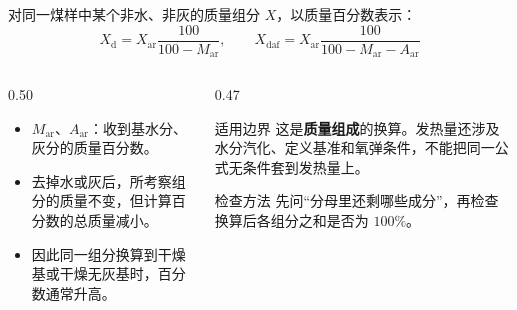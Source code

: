 \begin{frame}[t,shrink]{}
对同一煤样中某个非水、非灰的质量组分 \(X\)，以质量百分数表示：
$$
X_{\mathrm{d}}
=X_{\mathrm{ar}}\frac{100}{100-M_{\mathrm{ar}}},
\qquad
X_{\mathrm{daf}}
=X_{\mathrm{ar}}\frac{100}{100-M_{\mathrm{ar}}-A_{\mathrm{ar}}}
$$
\begin{columns}[T,onlytextwidth]
\begin{column}{0.50\textwidth}
  \begin{itemize}
    \item \(M_{\mathrm{ar}}\)、\(A_{\mathrm{ar}}\)：收到基水分、灰分的质量百分数。
    \item 去掉水或灰后，所考察组分的质量不变，但计算百分数的总质量减小。
    \item 因此同一组分换算到干燥基或干燥无灰基时，百分数通常升高。
  \end{itemize}
\end{column}
\begin{column}{0.47\textwidth}
  \begin{amberbox}{适用边界}
  \small 这是\textbf{质量组成}的换算。发热量还涉及水分汽化、定义基准和氧弹条件，不能把同一公式无条件套到发热量上。
  \end{amberbox}
  \vspace{0.7mm}
  \begin{keybox}{检查方法}
  \small 先问“分母里还剩哪些成分”，再检查换算后各组分之和是否为 \(100\%\)。
  \end{keybox}
\end{column}
\end{columns}
\end{frame}

